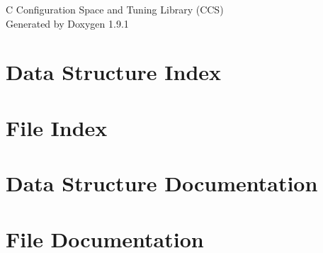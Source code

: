 \let\mypdfximage\pdfximage\def\pdfximage{\immediate\mypdfximage}\documentclass[twoside]{book}
\newcommand{\+}{\discretionary{\mbox{\scriptsize$\hookleftarrow$}}{}{}}
\newcommand{\clearemptydoublepage}{%
  \newpage{\pagestyle{empty}\cleardoublepage}%
}
\begin{document}
\raggedbottom

\hypersetup{pageanchor=false,
             bookmarksnumbered=true,
             pdfencoding=unicode
            }
\begin{titlepage}
\vspace*{7cm}
\begin{center}%
{\Large C Configuration Space and Tuning Library (CCS) }\\
\vspace*{1cm}
{\large Generated by Doxygen 1.9.1}\\
\end{center}
\end{titlepage}
\clearemptydoublepage
{}
\tableofcontents
\clearemptydoublepage
{}
\hypersetup{pageanchor=true}

\chapter{Data Structure Index}

\chapter{File Index}

\chapter{Data Structure Documentation}








\chapter{File Documentation}





















\backmatter
\newpage
{}
\clearemptydoublepage
{}
\printindex
\end{document}
